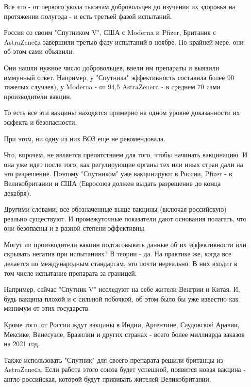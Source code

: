 Все это - от первого укола тысячам добровольцев до изучения их здоровья на
протяжении полугода - и есть третьей фазой испытаний.

Россия со своим "Спутником V", США с Moderna и Pfizer, Британия с AstraZeneсa
завершили третью фазу испытаний в ноябре. По крайней мере, они об этом сами
объявили. 

Они нашли нужное число добровольцев, ввели им препараты и выявили иммунный
ответ. Например, у "Спутника" эффективность составила более 90%
тяжелых случаев), у Moderna - от 94,5%
AstraZeneсa - в среднем 70%
сами производители вакцин.

То есть все эти вакцины находятся примерно на одном уровне доказанности их
эффекта и безопасности.

При этом, ни одну из них ВОЗ еще не рекомендовала.

Что, впрочем, не является препятствием для того, чтобы начинать вакцинацию. И
она уже идет после того, как регулирующие органы тех или иных стран дали на это
разрешение. Поэтому "Спутником" уже вакцинируют в России, Pfizer - в
Великобритании и США (Евросоюз должен выдать разрешение до конца декабря). 

Другими словами, все обозначенные выше вакцины (включая российскую) реально
существуют. И промежуточные показатели дают основания полагать, что они
безопасны и в разной степени эффективны. 

Могут ли производители вакцин подтасовывать данные об их эффективности или
скрывать негатив при испытаниях? В теории - да. На практике же, когда все
делается по международным стандартам, это почти нереально. В них входит в том
числе испытание препарата за границей.

Например, сейчас "Спутник V" исследуют на себе жители Венгрии и Китая. И, будь
вакцина плохой и с сильной побочкой, об этом было бы уже известно как минимум
от этих государств.

Кроме того, от России ждут вакцины в Индии, Аргентине, Саудовской Аравии,
Мексике, Венесуэле, Бразилии и других странах - всего более миллиарда заказов
на 2021 год.

Также использовать "Спутник" для своего препарата решили британцы из
AstraZeneсa.
Если работа этого союза будет успешной, появится новая вакцина -
англо-российская, которой будут прививать жителей Великобритании.

